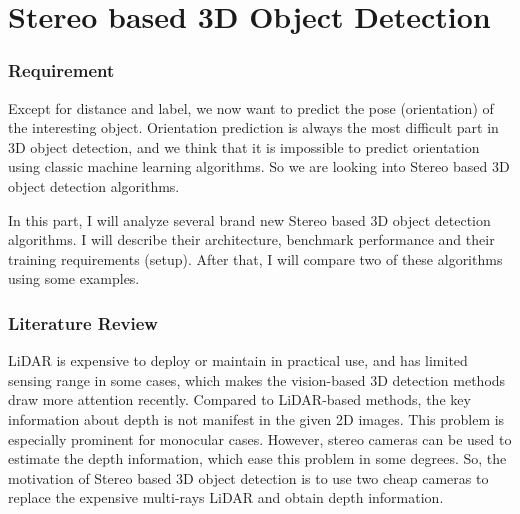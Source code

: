 \documentclass[12pt]{article}
\begin{document}
\part{Stereo based 3D Object Detection}
\section{Requirement}
Except for distance and label, we now want to predict the pose (orientation) of the interesting object. Orientation prediction is always the most difficult part in 3D object detection, and we think that it is impossible to predict orientation using classic machine learning algorithms. So we are looking into Stereo based 3D object detection algorithms. 

In this part, I will analyze several brand new Stereo based 3D object detection algorithms. I will describe their architecture, benchmark performance and their training requirements (setup). After that, I will compare two of these algorithms using some examples.
\section{Literature Review}
LiDAR is expensive to deploy or maintain in practical use, and has limited sensing range in some cases, which makes the vision-based 3D detection methods draw more attention recently. Compared to LiDAR-based methods, the key information about depth is not manifest in the given 2D images. This problem is especially prominent for monocular cases. However, stereo cameras can be used to estimate the depth information, which ease this problem in some degrees. So, the motivation of Stereo based 3D object detection is to use two cheap cameras to replace the expensive multi-rays LiDAR and obtain depth information.
\end{document}
